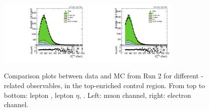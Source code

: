 \begin{figure}[htbp]
  \includegraphics[width=0.4\textwidth]{fig/analysis/CR_b1_mu_allP_allC_allE_Run2_met_pt.pdf}
  \includegraphics[width=0.4\textwidth]{fig/analysis/CR_b1_e_allP_allC_allE_Run2_met_pt.pdf}\\
  \caption{
    Comparison plots between data and MC from Run 2 for different \Wlep-related observables, in the top-enriched control region.
    From top to bottom: lepton \pt, lepton $\eta$, \Etmiss.
    Left: muon channel, right: electron channel.
  }
  \label{fig:CR_controlPlotsRun2_1}
\end{figure}

